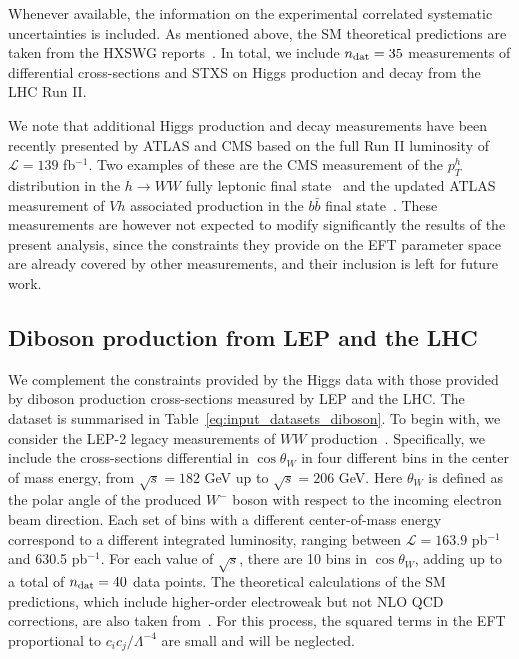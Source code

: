Whenever available, the
information on the experimental correlated systematic uncertainties is included.
As mentioned above, the SM theoretical predictions are taken
from the HXSWG reports~\cite{deFlorian:2016spz,
  Heinemeyer:2013tqa,Dittmaier:2012vm}.
%
In total, we include
$n_{\rm dat}=35$ measurements of differential cross-sections and STXS
on Higgs production and decay from the LHC Run II.

We note that additional Higgs production
and decay measurements have been recently presented by ATLAS and CMS based
on the full Run II luminosity of $\mathcal{L}=139$ fb$^{-1}$.
Two examples of these are the CMS measurement of the $p_T^h$ distribution in the
$h\to WW$ fully leptonic final state~\cite{Sirunyan:2020tzo} and the updated
ATLAS measurement of $Vh$ associated production in the $b\bar{b}$ final
state~\cite{Aad:2020jym}.
%
These measurements are however not expected to modify
significantly the results of the present analysis,
since the constraints they provide on the EFT parameter space are already
covered by other measurements, and  their inclusion is left for future work.

\subsection{Diboson production from LEP and the LHC}

We complement the constraints provided by the Higgs data with those
provided by diboson production cross-sections measured by LEP and the LHC.
The dataset is summarised in Table~\ref{eq:input_datasets_diboson}.
%
To begin with, we consider the LEP-2
legacy measurements of $WW$ production~\cite{Schael:2013ita}.
Specifically, we include the cross-sections differential
in $\cos\theta_W$ in four different bins in the center of
mass energy, from $\sqrt{s}=182$ GeV up to $\sqrt{s}=206$ GeV.
%
Here $\theta_{W}$ is defined as the polar angle of the produced
$W^-$ boson with respect to the incoming electron beam direction.
Each set of bins with a different center-of-mass energy
correspond to a different integrated luminosity, ranging
between $\mathcal{L}=163.9$ pb$^{-1}$ and 630.5 pb$^{-1}$.
For each value of $\sqrt{s}$, there are 10 bins in $\cos\theta_W$,
adding up to a total of $n_{\rm dat}=40$ data points.
The theoretical calculations of the SM predictions,
which include higher-order electroweak but not NLO QCD
corrections, are also taken from~\cite{Schael:2013ita}.
%
For this process, the squared terms in the EFT
proportional to
$c_ic_j/\Lambda^{-4}$ are small and will be neglected.


